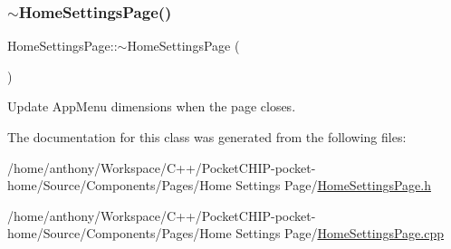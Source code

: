 \mbox{\label{classHomeSettingsPage_a4017e048f7a23fe23418f1f8eb2851dc}} 
\subsubsection{\texorpdfstring{$\sim$\+Home\+Settings\+Page()}{~HomeSettingsPage()}}
{\footnotesize\ttfamily Home\+Settings\+Page\+::$\sim$\+Home\+Settings\+Page (\begin{DoxyParamCaption}{ }\end{DoxyParamCaption})\hspace{0.3cm}{\ttfamily [virtual]}}

Update App\+Menu dimensions when the page closes. 

The documentation for this class was generated from the following files\+:\begin{DoxyCompactItemize}
\item 
/home/anthony/\+Workspace/\+C++/\+Pocket\+C\+H\+I\+P-\/pocket-\/home/\+Source/\+Components/\+Pages/\+Home Settings Page/\mbox{\hyperlink{HomeSettingsPage_8h}{Home\+Settings\+Page.\+h}}\item 
/home/anthony/\+Workspace/\+C++/\+Pocket\+C\+H\+I\+P-\/pocket-\/home/\+Source/\+Components/\+Pages/\+Home Settings Page/\mbox{\hyperlink{HomeSettingsPage_8cpp}{Home\+Settings\+Page.\+cpp}}\end{DoxyCompactItemize}
